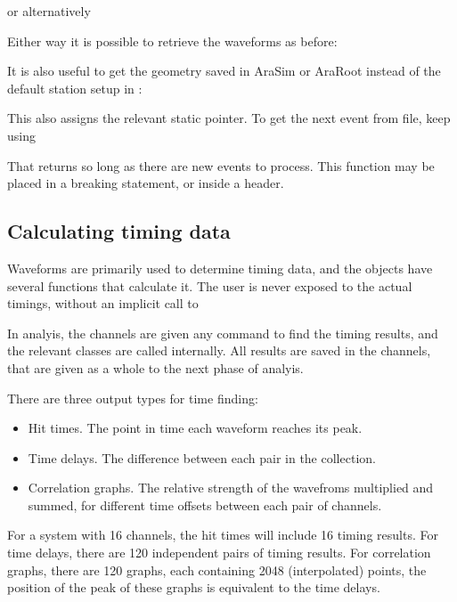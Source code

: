 \documentclass{article}
\newcommand{\class}[1]{\code{#1}}
\begin{document}
 or alternatively 
 
 
 Either way it is possible to retrieve the waveforms as before:
 
 
 It is also useful to get the geometry saved in AraSim or AraRoot
 instead of the default station setup in \class{Reconstruction}:
 

 This also assigns the relevant static pointer. 
 To get the next event from file, keep using 
 
 
 That returns  so long as there are new events to process. 
 This function may be placed in a breaking statement, or inside a  header. 
 
 \subsection{Calculating timing data}\label{section: basic timing data}
 
 Waveforms are primarily used to determine timing data, 
 and the \class{Channel} objects have several functions that calculate it. 
 The user is never exposed to the actual timings, without an implicit call to 
 
 
 In analyis, the channels are given any command to find the timing results, 
 and the relevant classes are called internally. 
 All results are saved in the channels, that are given as a whole to the next phase of analyis. 
 
 There are three output types for time finding:
 
 \begin{itemize}
  \item Hit times. The point in time each waveform reaches its peak.
  \item Time delays. The difference between each pair in the collection. 
  \item Correlation graphs. The relative strength of the wavefroms multiplied and summed, 
	for different time offsets between each pair of channels. 
 \end{itemize}

 For a system with 16 channels, the hit times will include 16 timing results. 
 For time delays, there are 120 independent pairs of timing results. 
 For correlation graphs, there are 120 graphs, each containing 2048 (interpolated) points, 
 the position of the peak of these graphs is equivalent to the time delays. 
 
\end{document}

